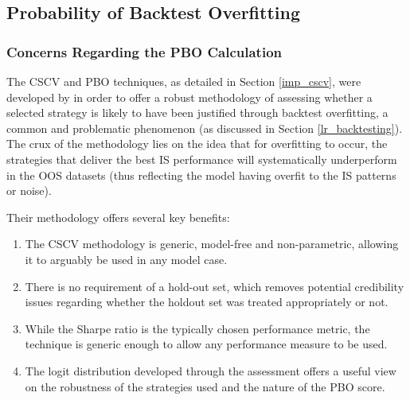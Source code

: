 \documentclass[a4paper,11pt,oneside]{article}
\theoremstyle{plain}
\theoremstyle{definition}
\begin{document}
	\newpage

	\subsection{Probability of Backtest Overfitting}\label{results_pbo}
	
	
	\subsubsection{Concerns Regarding the PBO Calculation}\label{results_pboconcerns}
	
	The CSCV and PBO techniques, as detailed in Section \ref{imp_cscv}, were developed by \citet{BailyPBO} in order to offer a robust methodology of assessing whether a selected strategy is likely to have been justified through backtest overfitting, a common and problematic phenomenon (as discussed in Section \ref{lr_backtesting}). The crux of the methodology lies on the idea that for overfitting to occur, the strategies that deliver the best IS performance will systematically underperform in the OOS datasets (thus reflecting the model having overfit to the IS patterns or noise).\newline
	
	Their methodology offers several key benefits:
	\begin{enumerate}
		\item The CSCV methodology is generic, model-free and non-parametric, allowing it to arguably be used in any model case.
		\item There is no requirement of a hold-out set, which removes potential credibility issues regarding whether the holdout set was treated appropriately or not.
		\item While the Sharpe ratio is the typically chosen performance metric, the technique is generic enough to allow any performance measure to be used.
		\item The logit distribution developed through the assessment offers a useful view on the robustness of the strategies used and the nature of the PBO score.
	\end{enumerate}
	
\end{document}
